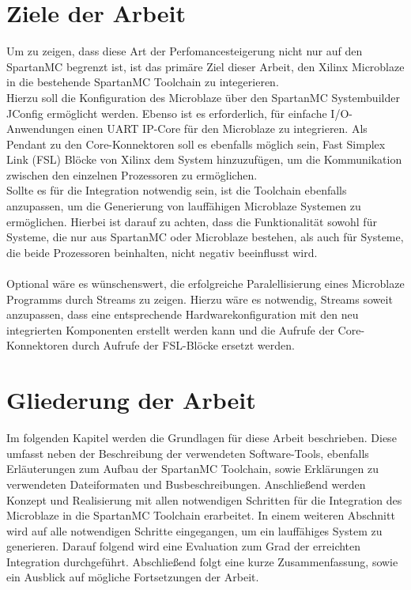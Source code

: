 \section{Ziele der Arbeit}
Um zu zeigen, dass diese Art der Perfomancesteigerung nicht nur auf den SpartanMC begrenzt ist, ist das primäre Ziel dieser Arbeit, den Xilinx Microblaze 
in die bestehende SpartanMC Toolchain zu integerieren.\\
Hierzu soll die Konfiguration des Microblaze über den SpartanMC Systembuilder JConfig ermöglicht werden. Ebenso ist es erforderlich, für einfache
I/O-Anwendungen einen UART IP-Core für den Microblaze zu integrieren. Als Pendant zu den Core-Konnektoren soll es ebenfalls möglich sein, Fast Simplex Link (FSL) Blöcke von Xilinx
dem System hinzuzufügen, um die Kommunikation zwischen den einzelnen Prozessoren zu ermöglichen.\\
Sollte es für die Integration notwendig sein, ist die Toolchain ebenfalls anzupassen, um die Generierung von lauffähigen Microblaze Systemen zu ermöglichen.
Hierbei ist darauf zu achten, dass die Funktionalität sowohl für Systeme, die nur aus SpartanMC oder Microblaze bestehen, als auch für Systeme, die beide Prozessoren beinhalten, 
nicht negativ beeinflusst wird.\\\\
Optional wäre es wünschenswert, die erfolgreiche Paralellisierung eines Microblaze Programms durch \textmu\/Streams zu zeigen. Hierzu wäre es notwendig, 
\textmu\/Streams soweit anzupassen, dass eine entsprechende Hardwarekonfiguration mit den neu integrierten Komponenten erstellt werden kann und
die Aufrufe der Core-Konnektoren durch Aufrufe der FSL-Blöcke ersetzt werden.
\section{Gliederung der Arbeit}
Im folgenden Kapitel werden die Grundlagen für diese Arbeit beschrieben. Diese umfasst neben der Beschreibung der verwendeten Software-Tools, ebenfalls Erläuterungen zum
Aufbau der SpartanMC Toolchain, sowie Erklärungen zu verwendeten Dateiformaten und Busbeschreibungen. Anschließend werden Konzept und Realisierung mit allen notwendigen Schritten 
für die Integration des Microblaze in die SpartanMC Toolchain erarbeitet. In einem weiteren 
Abschnitt wird auf alle notwendigen Schritte eingegangen, um ein lauffähiges System zu generieren. Darauf folgend wird eine Evaluation zum Grad der erreichten Integration
durchgeführt. Abschließend folgt eine kurze Zusammenfassung, sowie ein Ausblick auf mögliche Fortsetzungen der Arbeit.